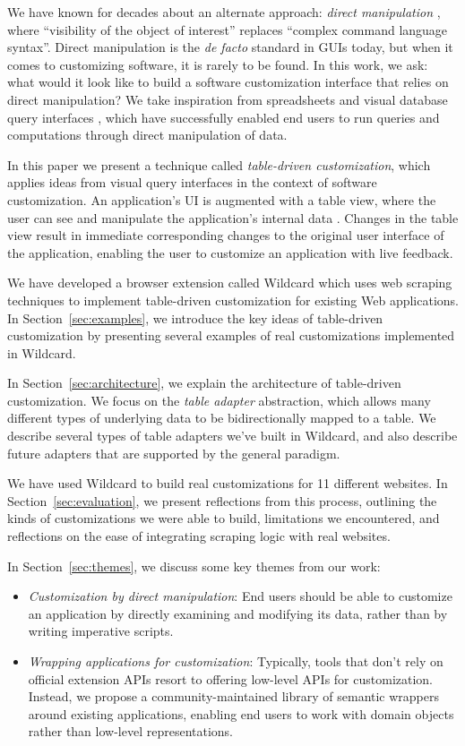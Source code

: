 \documentclass[sigplan,10pt,anonymous,review]{acmart}
\providecommand{\tightlist}{%
  \setlength{\itemsep}{0pt}\setlength{\parskip}{0pt}}
\begin{document}
We have known for decades about an alternate approach: \emph{direct
manipulation} \citep{shneiderman1983}, where ``visibility of the object
of interest'' replaces ``complex command language syntax''. Direct
manipulation is the \emph{de facto} standard in GUIs today, but when it
comes to customizing software, it is rarely to be found. In this work,
we ask: what would it look like to build a software customization
interface that relies on direct manipulation? We take inspiration from
spreadsheets and visual database query interfaces
\citep{2020a, bakke2016}, which have successfully enabled end users to
run queries and computations through direct manipulation of data.

In this paper we present a technique called \emph{table-driven
customization}, which applies ideas from visual query interfaces in the
context of software customization. An application's UI is augmented with
a table view, where the user can see and manipulate the application's
internal data . Changes in the table view result in immediate
corresponding changes to the original user interface of the application,
enabling the user to customize an application with live feedback.

We have developed a browser extension called Wildcard which uses web
scraping techniques to implement table-driven customization for existing
Web applications. In Section~\ref{sec:examples}, we introduce the key
ideas of table-driven customization by presenting several examples of
real customizations implemented in Wildcard.

In Section~\ref{sec:architecture}, we explain the architecture of
table-driven customization. We focus on the \emph{table adapter}
abstraction, which allows many different types of underlying data to be
bidirectionally mapped to a table. We describe several types of table
adapters we've built in Wildcard, and also describe future adapters that
are supported by the general paradigm.

We have used Wildcard to build real customizations for 11 different
websites. In Section~\ref{sec:evaluation}, we present reflections from
this process, outlining the kinds of customizations we were able to
build, limitations we encountered, and reflections on the ease of
integrating scraping logic with real websites.

In Section~\ref{sec:themes}, we discuss some key themes from our work:

\begin{itemize}
\tightlist
\item
  \emph{Customization by direct manipulation}: End users should be able
  to customize an application by directly examining and modifying its
  data, rather than by writing imperative scripts.
\item
  \emph{Wrapping applications for customization}: Typically, tools that
  don't rely on official extension APIs resort to offering low-level
  APIs for customization. Instead, we propose a community-maintained
  library of semantic wrappers around existing applications, enabling
  end users to work with domain objects rather than low-level
  representations.
\end{itemize}
\end{document}
